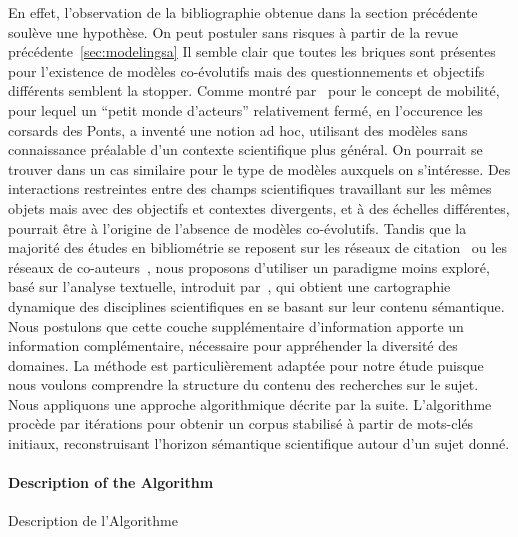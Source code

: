 {En effet, l'observation de la bibliographie obtenue dans la section précédente soulève une hypothèse. On peut postuler sans risques à partir de la revue précédente~\ref{sec:modelingsa} Il semble clair que toutes les briques sont présentes pour l'existence de modèles co-évolutifs mais des questionnements et objectifs différents semblent la stopper. Comme montré par~\cite{commenges:tel-00923682} pour le concept de mobilité, pour lequel un ``petit monde d'acteurs'' relativement fermé, en l'occurence les corsards des Ponts, a inventé une notion ad hoc, utilisant des modèles sans connaissance préalable d'un contexte scientifique plus général. On pourrait se trouver dans un cas similaire pour le type de modèles auxquels on s'intéresse. Des interactions restreintes entre des champs scientifiques travaillant sur les mêmes objets mais avec des objectifs et contextes divergents, et à des échelles différentes, pourrait être à l'origine de l'absence de modèles co-évolutifs. Tandis que la majorité des études en bibliométrie se reposent sur les réseaux de citation~\cite{2013arXiv1310.8220N} ou les réseaux de co-auteurs~\cite{2014arXiv1402.7268S}, nous proposons d'utiliser un paradigme moins exploré, basé sur l'analyse textuelle, introduit par~\cite{chavalarias2013phylomemetic}, qui obtient une cartographie dynamique des disciplines scientifiques en se basant sur leur contenu sémantique. Nous postulons que cette couche supplémentaire d'information apporte un information complémentaire, nécessaire pour appréhender la diversité des domaines. La méthode est particulièrement adaptée pour notre étude puisque nous voulons comprendre la structure du contenu des recherches sur le sujet. Nous appliquons une approche algorithmique décrite par la suite. L'algorithme procède par itérations pour obtenir un corpus stabilisé à partir de mots-clés initiaux, reconstruisant l'horizon sémantique scientifique autour d'un sujet donné.
}


\paragraph{Description of the Algorithm}{Description de l'Algorithme}


